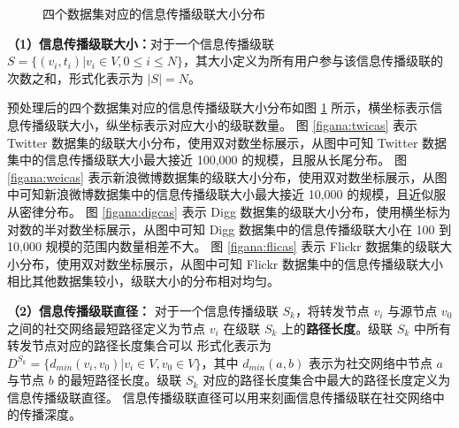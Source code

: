 \begin{figure}
	\centering

    \caption{四个数据集对应的信息传播级联大小分布}
    \label{figana:cas}
\end{figure}


\textbf{（1）信息传播级联大小：}对于一个信息传播级联 $S=\{(v_{i},t_{i})|v_{i}\in V,0\le i \le N\}$，其大小定义为所有用户参与该信息传播级联的次数之和，形式化表示为 $|S|=N$。

预处理后的四个数据集对应的信息传播级联大小分布如图 \ref{figana:cas} 所示，横坐标表示信息传播级联大小，纵坐标表示对应大小的级联数量。
图 \ref{figana:twicas} 表示 Twitter 数据集的级联大小分布，使用双对数坐标展示，从图中可知 Twitter 数据集中的信息传播级联大小最大接近 100,000 的规模，且服从长尾分布。
图 \ref{figana:weicas} 表示新浪微博数据集的级联大小分布，使用双对数坐标展示，从图中可知新浪微博数据集中的信息传播级联大小最大接近 10,000 的规模，且近似服从密律分布。
图 \ref{figana:digcas} 表示 Digg 数据集的级联大小分布，使用横坐标为对数的半对数坐标展示，从图中可知 Digg 数据集中的信息传播级联大小在 100 到 10,000 规模的范围内数量相差不大。
图 \ref{figana:flicas} 表示 Flickr 数据集的级联大小分布，使用双对数坐标展示，从图中可知 Flickr 数据集中的信息传播级联大小相比其他数据集较小，级联大小的分布相对均匀。





\textbf{（2）信息传播级联直径：}
对于一个信息传播级联 $S_{k}$，将转发节点 $v_{i}$ 与源节点 $v_{0}$ 之间的社交网络最短路径定义为节点 $v_{i}$ 在级联 $S_{k}$ 上的\textbf{路径长度}。级联 $S_{k}$ 中所有转发节点对应的路径长度集合可以
形式化表示为 $D^{S_{k}} = \{d_{min}(v_{i},v_{0})|v_{i} \in V, v_{0} \in V\}$，其中 $d_{min}(a,b)$ 表示为社交网络中节点 $a$ 与节点 $b$ 的最短路径长度。级联 $S_{k}$ 对应的路径长度集合中最大的路径长度定义为信息传播级联直径。
信息传播级联直径可以用来刻画信息传播级联在社交网络中的传播深度。


